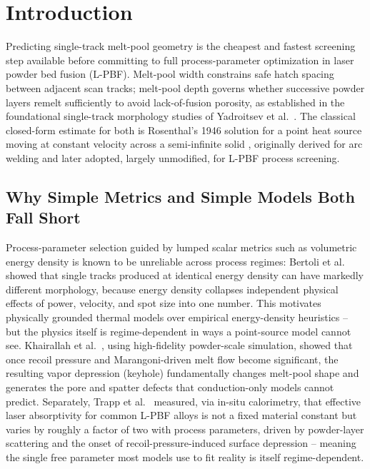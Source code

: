 \documentclass[12pt]{article}
\begin{document}
\section{Introduction}

Predicting single-track melt-pool geometry is the cheapest and fastest screening step available before committing to full process-parameter optimization in laser powder bed fusion (L-PBF). Melt-pool width constrains safe hatch spacing between adjacent scan tracks; melt-pool depth governs whether successive powder layers remelt sufficiently to avoid lack-of-fusion porosity, as established in the foundational single-track morphology studies of Yadroitsev et al.\ \cite{yadroitsev2010}. The classical closed-form estimate for both is Rosenthal's 1946 solution for a point heat source moving at constant velocity across a semi-infinite solid \cite{rosenthal1946}, originally derived for arc welding and later adopted, largely unmodified, for L-PBF process screening.

\subsection{Why Simple Metrics and Simple Models Both Fall Short}
Process-parameter selection guided by lumped scalar metrics such as volumetric energy density is known to be unreliable across process regimes: Bertoli et al.\ \cite{bertoli2017} showed that single tracks produced at identical energy density can have markedly different morphology, because energy density collapses independent physical effects of power, velocity, and spot size into one number. This motivates physically grounded thermal models over empirical energy-density heuristics -- but the physics itself is regime-dependent in ways a point-source model cannot see. Khairallah et al.\ \cite{khairallah2016}, using high-fidelity powder-scale simulation, showed that once recoil pressure and Marangoni-driven melt flow become significant, the resulting vapor depression (keyhole) fundamentally changes melt-pool shape and generates the pore and spatter defects that conduction-only models cannot predict. Separately, Trapp et al.\ \cite{trapp2017} measured, via in-situ calorimetry, that effective laser absorptivity for common L-PBF alloys is not a fixed material constant but varies by roughly a factor of two with process parameters, driven by powder-layer scattering and the onset of recoil-pressure-induced surface depression -- meaning the single free parameter most models use to fit reality is itself regime-dependent.
\end{document}

